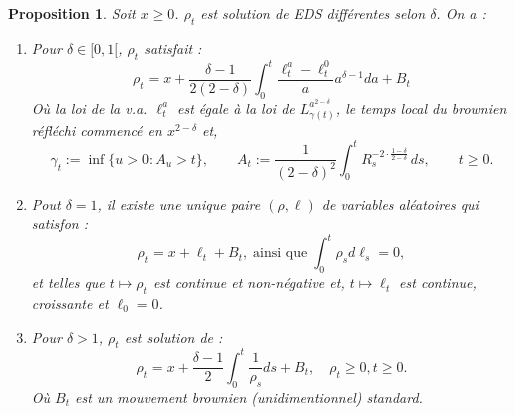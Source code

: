\documentclass[openany]{book}
\newcommand{\1}{\mathbbm{1}}
\theoremstyle{thmfont}
\theoremstyle{deffont}
\theoremstyle{thmfont}
\newtheorem{prop}[prop]{Proposition}
\theoremstyle{deffont}
\begin{document}
\begin{prop} Soit $x \geq 0$. $\rho_t$ est solution de EDS différentes selon $\delta$. On a :
  \begin{enumerate}
    \item Pour $\delta \in [0,1[$, $\rho_t$ satisfait :
     \begin{equation}
       \rho_t = x + \dfrac{\delta-1}{2(2-\delta)}\int_0^t \dfrac{\ell_t^a- \ell_t^0}{a}a^{\delta-1} da + B_t
       \label{eq:EDSBessel3}
     \end{equation}
     Où la loi de la v.a. $\ell_t^a$ est égale à la loi de $L_{\gamma(t)}^{a^{2-\delta}}$, le temps local du brownien réfléchi commencé en $x^{2-\delta}$ et,
     $$\gamma_t := \inf\{u > 0 : A_u > t\}, \qquad
     A_t := \frac{1}{(2 - \delta)^2} \int_0^t R_s^{-2 \cdot \frac{1 - \delta}{2 - \delta}} \, ds, \qquad t \geq 0.$$
   \item Pout $\delta =1$, il existe une unique paire $(\rho, \ell)$ de variables aléatoires qui satisfon :
     \begin{equation}
       \rho_t = x + \ell_t + B_t, \;\text{ainsi que}\; \int_0^t \rho_s d\ell_s = 0,
       \label{eq:EDSBessel2}
     \end{equation}
     et telles que $t\mapsto \rho_t$ est continue et non-négative et, $t \mapsto \ell_t$ est continue, croissante et $\ell_0 = 0$.\\
   \item Pour $\delta > 1$, $\rho_t$ est solution de :
     \begin{equation}
       \rho_t = x + \dfrac{\delta-1}{2}\int_0^t \dfrac{1}{\rho_s} ds + B_t, \quad \rho_t \geq 0, t \geq 0.
       \label{eq:EDSBessel1}
     \end{equation}
     Où $B_t$ est un mouvement brownien (unidimentionnel) standard.\\
\end{enumerate}
\end{prop}
\end{document}
